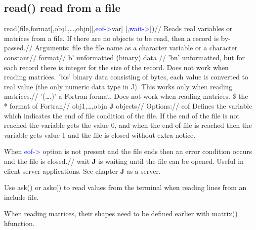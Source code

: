 \subsection{\textcolor{VioletRed}{read}() read from a file}
\label{read}
\textcolor{VioletRed}{read}(file,format[,obj1,…,objn][,\textcolor{blue}{eof->}var] [,\textcolor{blue}{wait->}])//
Reads real variables or matrices from a file. If there are no objects
to be read, then a record is
by-passed.//
Arguments:
file the file name as a character variable or a character constant//
format//
b' unformatted (binary) data //
'bn' unformatted, but for each record there is integer for the size of the record. Does
not work when reading matrices.
'bis' binary data consisting of bytes, each value is converted to real value (the only
numeric data type in J). This works only when reading matrices.//
'(….)' a Fortran format. Does not work when reading matrices.
\$ the * format of Fortran//
obj1,…,objn
\textbf{J} objects//
Options://
eof Defines the variable which indicates the end of file condition of the file. If the end
of the file is not reached the variable gets the value 0, and when the end of file is
reached then the variable gets value 1 and the file is closed without extra notice.

When \textcolor{blue}{eof->} option is not present and the file ends then an error
condition occurs and the file is closed.//
wait \textbf{J} is waiting until the file can be opened. Useful in client-server applications. See
chapter \textbf{J} as a server.
\begin{note}
Use \textcolor{VioletRed}{ask}() or \textcolor{VioletRed}{askc}() to read values from the terminal when reading lines from an
include file.
\end{note}
\begin{note}
When reading matrices, their shapes need to
be defined earlier with \textcolor{VioletRed}{matrix}()
hfunction.
\end{note}
